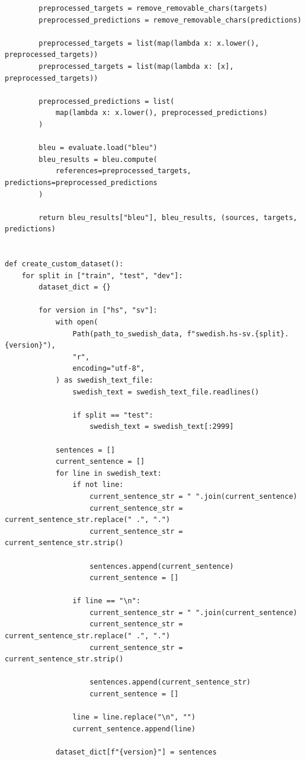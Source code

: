 \documentclass{article}
\begin{document}
\begin{lstlisting}
        preprocessed_targets = remove_removable_chars(targets)
        preprocessed_predictions = remove_removable_chars(predictions)

        preprocessed_targets = list(map(lambda x: x.lower(), preprocessed_targets))
        preprocessed_targets = list(map(lambda x: [x], preprocessed_targets))

        preprocessed_predictions = list(
            map(lambda x: x.lower(), preprocessed_predictions)
        )

        bleu = evaluate.load("bleu")
        bleu_results = bleu.compute(
            references=preprocessed_targets, predictions=preprocessed_predictions
        )

        return bleu_results["bleu"], bleu_results, (sources, targets, predictions)


def create_custom_dataset():
    for split in ["train", "test", "dev"]:
        dataset_dict = {}

        for version in ["hs", "sv"]:
            with open(
                Path(path_to_swedish_data, f"swedish.hs-sv.{split}.{version}"),
                "r",
                encoding="utf-8",
            ) as swedish_text_file:
                swedish_text = swedish_text_file.readlines()

                if split == "test":
                    swedish_text = swedish_text[:2999]

            sentences = []
            current_sentence = []
            for line in swedish_text:
                if not line:
                    current_sentence_str = " ".join(current_sentence)
                    current_sentence_str = current_sentence_str.replace(" .", ".")
                    current_sentence_str = current_sentence_str.strip()

                    sentences.append(current_sentence)
                    current_sentence = []

                if line == "\n":
                    current_sentence_str = " ".join(current_sentence)
                    current_sentence_str = current_sentence_str.replace(" .", ".")
                    current_sentence_str = current_sentence_str.strip()

                    sentences.append(current_sentence_str)
                    current_sentence = []

                line = line.replace("\n", "")
                current_sentence.append(line)

            dataset_dict[f"{version}"] = sentences


\end{lstlisting}
\end{document}
